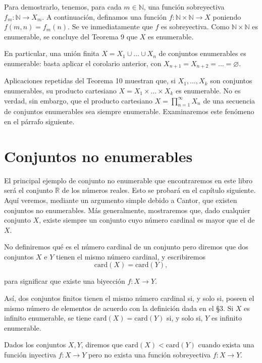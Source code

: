 \documentclass[12pt,oneside]{book}
\begin{document}
Para demostrarlo, tenemos, para cada \( m \in \mathbb{N} \), una función sobreyectiva \( f_m: \mathbb{N} \to X_m \). A continuación, definamos una función \( f: \mathbb{N} \times \mathbb{N} \to X \) poniendo \( f(m, n) = f_m(n) \). Se ve inmediatamente que \( f \) es sobreyectiva. Como \( \mathbb{N} \times \mathbb{N} \) es enumerable, se concluye del Teorema 9 que \( X \) es enumerable.

En particular, una unión finita \( X = X_1 \cup \dots \cup X_n \) de conjuntos enumerables es enumerable: basta aplicar el corolario anterior, con \( X_{n+1} = X_{n+2} = \dots = \varnothing \).

Aplicaciones repetidas del Teorema 10 muestran que, si \( X_1, \dots, X_k \) son conjuntos enumerables, su producto cartesiano \( X = X_1 \times \dots \times X_k \) es enumerable. No es verdad, sin embargo, que el producto cartesiano \( X = \prod_{n=1}^{\infty} X_n \) de una secuencia de conjuntos enumerables sea siempre enumerable. Examinaremos este fenómeno en el párrafo siguiente.

\section{Conjuntos no enumerables}

El principal ejemplo de conjunto no enumerable que encontraremos en este libro será el conjunto \( \mathbb{R} \) de los números reales. Esto se probará en el capítulo siguiente. Aquí veremos, mediante un argumento simple debido a Cantor, que existen conjuntos no enumerables. Más generalmente, mostraremos que, dado cualquier conjunto \( X \), existe siempre un conjunto cuyo número cardinal es mayor que el de \( X \).

No definiremos qué es el número cardinal de un conjunto pero diremos que dos conjuntos \( X \) e \( Y \) tienen el mismo número cardinal, y escribiremos
\[ \text{card}(X) = \text{card}(Y), \]

para significar que existe una biyección \( f: X \to Y \).

Así, dos conjuntos finitos tienen el mismo número cardinal si, y solo si, poseen el mismo número de elementos de acuerdo con la definición dada en el §3. Si \( X \) es infinito enumerable, se tiene \( \text{card}(X) = \text{card}(Y) \) si, y solo si, \( Y \) es infinito enumerable.

Dados los conjuntos \( X, Y \), diremos que \( \text{card}(X) < \text{card}(Y) \) cuando exista una función inyectiva \( f: X \to Y \) pero no exista una función sobreyectiva \( f: X \to Y \).
\end{document}
